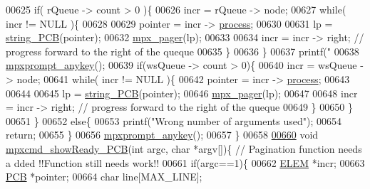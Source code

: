\begin{DoxyCode}
{{{{00625                 \textcolor{keywordflow}{if}( rQueue -> count > 0 )\{
00626                 incr = rQueue -> node;
00627                 \textcolor{keywordflow}{while}( incr != NULL )\{
00628                         
00629                         pointer = incr -> \hyperlink{structprocess}{process};
00630                 
00631                         lp = \hyperlink{mpx__r2_8c_aa1ebf78ebfc66e910acd6efdcf6b2437}{string_PCB}(pointer);
00632                         \hyperlink{mpx__util_8c_a9e59881f10bd91d7255f18f205e101e6}{mpx_pager}(lp);
00633                         
00634                         incr = incr -> right; \textcolor{comment}{// progress forward to the right of
       the queque}
00635                 \}
00636             \} 
00637                 printf(\textcolor{stringliteral}{"%
00638                 \hyperlink{mpx__util_8c_a338d01dfe3c80732c00450203c85b964}{mpxprompt_anykey}();
00639                 \textcolor{keywordflow}{if}(wsQueue -> count > 0)\{
00640                 incr = wsQueue -> node;
00641                 \textcolor{keywordflow}{while}( incr != NULL )\{
00642                         pointer = incr -> \hyperlink{structprocess}{process};
00643                 
00644                         
00645                         lp = \hyperlink{mpx__r2_8c_aa1ebf78ebfc66e910acd6efdcf6b2437}{string_PCB}(pointer);
00646                         \hyperlink{mpx__util_8c_a9e59881f10bd91d7255f18f205e101e6}{mpx_pager}(lp);
00647                         
00648                         incr = incr -> right; \textcolor{comment}{// progress forward to the right of
       the queque}
00649                 \}
00650                 \}
00651         \}
00652         \textcolor{keywordflow}{else}\{
00653                 printf(\textcolor{stringliteral}{"Wrong number of arguments used"});       
00654                 \textcolor{keywordflow}{return};
00655         \}
00656         \hyperlink{mpx__util_8c_a338d01dfe3c80732c00450203c85b964}{mpxprompt_anykey}();
00657 \}
00658 
\hypertarget{mpx__r2_8c_source_l00660}{}\hyperlink{mpx__r2_8h_aeaac6d37294f767e31c3789971c5ecd4}{00660} \textcolor{keywordtype}{void} \hyperlink{mpx__r2_8c_aeaac6d37294f767e31c3789971c5ecd4}{mpxcmd_showReady_PCB}(\textcolor{keywordtype}{int} argc, \textcolor{keywordtype}{char} *argv[])\{ \textcolor{comment}{// Pagination function needs a
      dded !!Function still needs work!!}
00661         \textcolor{keywordflow}{if}(argc==1)\{
00662                 \hyperlink{structpage}{ELEM} *incr;
00663                 \hyperlink{structprocess}{PCB} *pointer;
00664                 \textcolor{keywordtype}{char} line[MAX\_LINE];
}}}}}
\end{DoxyCode}
